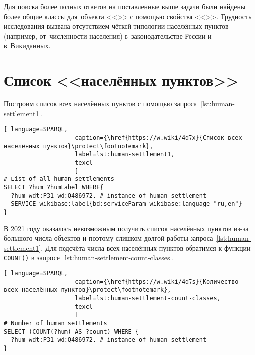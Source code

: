 Для поиска более полных ответов на поставленные выше задачи  
были найдены более общие классы для~объекта <<>> 
с помощью свойства <<>>. 
Трудность исследования вызвана отсутствием чёткой типологии населённых пунктов 
(например, от~численности населения) в~законодательстве России и в~Викиданных.



\section{Список <<населённых пунктов>>}

Построим список всех населённых пунктов с помощью запроса~\ref{lst:human-settlement1}.

\begin{lstlisting}[ language=SPARQL, 
                    caption={\href{https://w.wiki/4d7x}{Список всех населённых пунктов}\protect\footnotemark},
                    label=lst:human-settlement1,
                    texcl 
                    ]
# List of all human settlements
SELECT ?hum ?humLabel WHERE{
  ?hum wdt:P31 wd:Q486972. # instance of human settlement
  SERVICE wikibase:label{bd:serviceParam wikibase:language "ru,en"}
}
\end{lstlisting}%

В 2021 году оказалось невозможным получить список населённых пунктов 
из-за большого числа объектов и поэтому слишком долгой работы запроса~\ref{lst:human-settlement1}. 
Для подсчёта числа всех населённых пунктов обратимся к функции \lstinline|COUNT()| 
в запросе~\ref{lst:human-settlement-count-classes}.

\begin{lstlisting}[ language=SPARQL, 
                    caption={\href{https://w.wiki/4d7s}{Количество всех населённых пунктов}\protect\footnotemark},
                    label=lst:human-settlement-count-classes,
                    texcl 
                    ]
# Number of human settlements
SELECT (COUNT(?hum) AS ?count) WHERE {
  ?hum wdt:P31 wd:Q486972. # instance of human settlement  
}
\end{lstlisting}%

